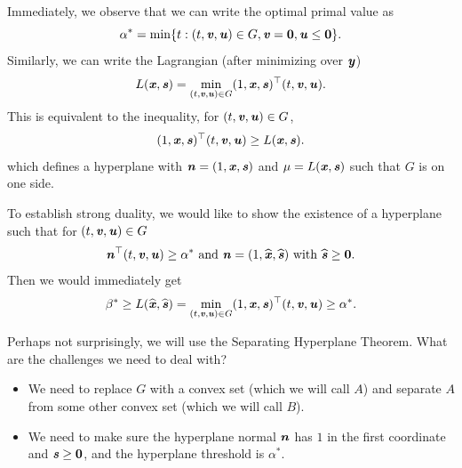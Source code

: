 {Immediately, we observe that we can write the optimal primal value as
\begin{equation*} \alpha^* = \min \{t:(t,\vv,\uu) \in G, \vv = \veczero, \uu \leq \veczero\}. \end{equation*}
Similarly, we can write the Lagrangian (after minimizing over $\yy$)
\begin{equation*} L(\xx, \ss) = \min_{(t,\vv,\uu) \in G} (1, \xx, \ss)^{\trp} (t, \vv, \uu). \end{equation*}
This is equivalent to the inequality, for $(t,\vv,\uu) \in G$,
\begin{equation*} (1, \xx, \ss)^{\trp}(t, \vv, \uu) \geq L(\xx, \ss). \end{equation*}
which defines a hyperplane with $\nn = (1,\xx,\ss)$ and $\mu = L(\xx,
\ss)$ such that $G$ is on one side.

To establish strong duality, we would like to show the existence of a
hyperplane such that for $(t,\vv,\uu) \in G$
\[
  \nn^{\trp}(t, \vv, \uu) \geq \alpha^* \text{ and } \nn = (1,\xxhat,\sshat)
  \text{ with } \sshat \geq \veczero.
\]
Then we would immediately get
\begin{equation*}
 \beta^* \geq L(\xxhat,\sshat)= \min_{(t,\vv,\uu) \in G} (1, \xx,
 \ss)^{\trp} (t, \vv, \uu) \geq \alpha^* .
\end{equation*}

Perhaps not surprisingly, we will use the Separating
Hyperplane Theorem.
What are the challenges we need to deal with?
\begin{itemize}
\item We need to replace $G$ with a convex set (which we will call
  $A$) and separate $A$ from some other convex set (which we will call $B$).
\item We need to make sure the hyperplane normal $\nn$ has $1$ in the first
  coordinate and $\ss \geq \veczero$, and the hyperplane threshold is $\alpha^*$.
\end{itemize}




}
